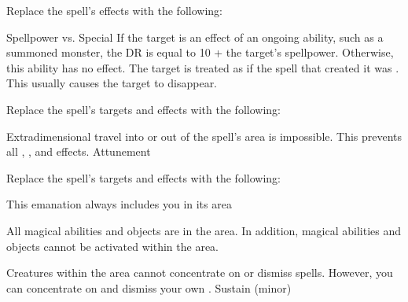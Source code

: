 Replace the spell's effects with the following:
\begin{spellcontent}
\begin{augmenteffects}
\begin{spellattack}{Spellpower vs. Special}
\spellspecial
If the target is an effect of an ongoing  ability, such as a summoned monster, the DR is equal to 10 + the target's spellpower.
Otherwise, this ability has no effect.
\spellsuccess
The target is treated as if the spell that created it was .
This usually causes the target to disappear.
\end{spellattack}
\end{augmenteffects}
\end{spellcontent}
Replace the spell's targets and effects with the following:
\begin{spellcontent}
\begin{augmenttargetinginfo}
\end{augmenttargetinginfo}
\begin{augmenteffects}
\spelleffect
Extradimensional travel into or out of the spell's area is impossible.
This prevents all , , and  effects.
\spelldur Attunement
\end{augmenteffects}
\end{spellcontent}
Replace the spell's targets and effects with the following:
\begin{spellcontent}
\begin{augmenttargetinginfo}
\spellspecial This emanation always includes you in its area
\end{augmenttargetinginfo}
\begin{augmenteffects}
\spelleffect
All magical abilities and objects are  in the area.
In addition, magical abilities and objects cannot be activated within the area.
\par Creatures within the area cannot concentrate on or dismiss spells. However, you can concentrate on and dismiss your own .
\spelldur Sustain (minor)
\end{augmenteffects}
\end{spellcontent}
